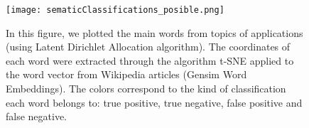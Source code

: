 \begin{figure}[h]
  \label{fig:semanticClassification}
  \texttt{[image: sematicClassifications\_posible.png]}
    \caption{In this figure, we plotted the main words from topics of applications (using Latent Dirichlet Allocation algorithm). The coordinates of each word were extracted through the algorithm t-SNE applied to the word vector from Wikipedia articles (Gensim Word Embeddings). The colors correspond to the kind of classification each word belongs to: true positive, true negative, false positive and false negative.}
\end{figure}